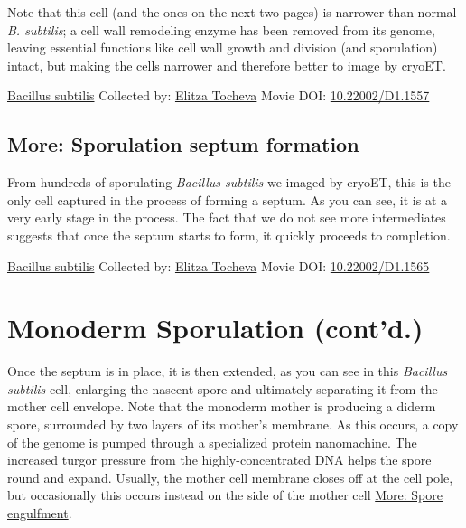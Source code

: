 \documentclass[]{tufte-book}
\begin{document}
Note that this cell (and the ones on the next two pages) is narrower than normal \emph{B. subtilis}; a cell wall remodeling enzyme has been removed from its genome, leaving essential functions like cell wall growth and division (and sporulation) intact, but making the cells narrower and therefore better to image by cryoET.



\hypertarget{htmlwidget-2d38554ccfcf2bc77fca}{}

\label{fig:8-5}\protect\hyperlink{tree}{Bacillus subtilis} Collected by: \protect\hyperlink{elitza_tocheva}{Elitza Tocheva} Movie DOI: \href{https://doi.org/10.22002/D1.1557}{10.22002/D1.1557}

\hypertarget{Sporulation_septum_formation}{%
\subsection*{More: Sporulation septum formation}\label{Sporulation_septum_formation}}

From hundreds of sporulating \emph{Bacillus subtilis} we imaged by cryoET, this is the only cell captured in the process of forming a septum. As you can see, it is at a very early stage in the process. The fact that we do not see more intermediates suggests that once the septum starts to form, it quickly proceeds to completion.



\hypertarget{htmlwidget-489a9cfff2d0fe150459}{}

\label{fig:8-5a}\protect\hyperlink{tree}{Bacillus subtilis} Collected by: \protect\hyperlink{elitza_tocheva}{Elitza Tocheva} Movie DOI: \href{https://doi.org/10.22002/D1.1565}{10.22002/D1.1565}

\hypertarget{monoderm-sporulation-contd.}{%
\section{Monoderm Sporulation (cont'd.)}\label{monoderm-sporulation-contd.}}

Once the septum is in place, it is then extended, as you can see in this \emph{Bacillus subtilis} cell, enlarging the nascent spore and ultimately separating it from the mother cell envelope. Note that the monoderm mother is producing a diderm spore, surrounded by two layers of its mother's membrane. As this occurs, a copy of the genome is pumped through a specialized protein nanomachine. The increased turgor pressure from the highly-concentrated DNA helps the spore round and expand. Usually, the mother cell membrane closes off at the cell pole, but occasionally this occurs instead on the side of the mother cell \protect\hyperlink{Spore_engulfment}{More: Spore engulfment}.
\end{document}
